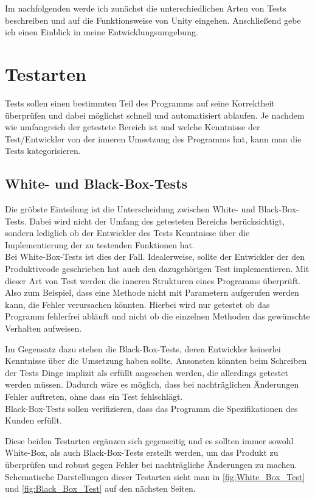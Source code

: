 Im nachfolgenden werde ich zunächst die unterschiedlichen Arten von Tests beschreiben und auf die Funktionsweise von Unity eingehen. Anschließend gebe ich einen Einblick in meine Entwicklungsumgebung.

\section{Testarten}

Tests sollen einen bestimmten Teil des Programms auf seine Korrektheit überprüfen und dabei möglichst schnell und automatisiert ablaufen. Je nachdem wie umfangreich der getestete Bereich ist und welche Kenntnisse der Test/Entwickler von der inneren Umsetzung des Programms hat, kann man die Tests kategorisieren.

\subsection{White- und Black-Box-Tests}

Die gröbste Einteilung ist die Unterscheidung zwischen White- und Black-Box-Tests. Dabei wird nicht der Umfang des getesteten Bereichs berücksichtigt, sondern lediglich ob der Entwickler des Tests Kenntnisse über die Implementierung der zu testenden Funktionen hat.\\
Bei White-Box-Tests ist dies der Fall. Idealerweise, sollte der Entwickler der den Produktivcode geschrieben hat auch den dazugehörigen Test implementieren. Mit dieser Art von Test werden die inneren Strukturen eines Programms überprüft. Also zum Beispiel, dass eine Methode nicht mit Parametern aufgerufen werden kann, die Fehler verursachen könnten. Hierbei wird nur getestet ob das Programm fehlerfrei abläuft und nicht ob die einzelnen Methoden das gewünschte Verhalten aufweisen.

Im Gegensatz dazu stehen die Black-Box-Tests, deren Entwickler keinerlei Kenntnisse über die Umsetzung haben sollte. Ansonsten könnten beim Schreiben der Tests Dinge implizit als erfüllt angesehen werden, die allerdings getestet werden müssen. Dadurch wäre es möglich, dass bei nachträglichen Änderungen Fehler auftreten, ohne dass ein Test fehlschlägt.\\
Black-Box-Tests sollen verifizieren, dass das Programm die Spezifikationen des Kunden erfüllt.

Diese beiden Testarten ergänzen sich gegenseitig und es sollten immer sowohl White-Box, als auch Black-Box-Tests erstellt werden, um das Produkt zu überprüfen und robust gegen Fehler bei nachträgliche Änderungen zu machen.\\
Schematische Darstellungen dieser Testarten sieht man in \autoref{fig:White_Box_Test} und \autoref{fig:Black_Box_Test} auf den nächsten Seiten.

